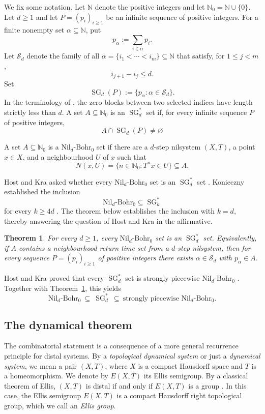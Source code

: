 \documentclass[11pt]{amsart}
\newtheorem{theorem}{Theorem}[section]
\theoremstyle{definition}
\theoremstyle{remark}
\DeclareMathOperator{\SG}{SG}
\newcommand{\N}{\mathbb N}
\newcommand{\Nzero}{\mathbb N_0}
\newcommand{\Z}{\mathbb Z}
\newcommand{\Sd}{\mathcal S_d}
\newcommand{\NilBohr}[1]{\mathrm{Nil}_{#1}\text{-}\mathrm{Bohr}_0}
\begin{document}
We fix some notation. Let $\N$ denote the positive integers and let $\N_0=\N\cup \{0\}$.
Let $d\geq1$ and let $P=(p_i)_{i\geq1}$ be an infinite
sequence of positive integers.  For a finite nonempty set
$\alpha\subseteq\N$, put
\[
 p_\alpha:=\sum_{i\in\alpha}p_i.
\]
Let $\Sd$ denote the family of all
$\alpha=\{i_1<\cdots<i_m\}\subseteq\N$ that satisfy, for $1\leq j<m$,
\[
 i_{j+1}-i_j\leq d.
\]
Set
\[
 \SG_d(P):=\{p_\alpha:\alpha\in\Sd\}.
\]
In the terminology of \cite{HostKra2011}, the zero blocks between two
selected indices have length strictly less than $d$.  A set $A\subseteq\Nzero$
is an $\SG_d^*$ set if, for every infinite sequence $P$ of positive integers,
\[
 A\cap\SG_d(P)\neq\varnothing
\]

A set $A\subseteq\Nzero$ is a $\NilBohr{d}$ set if there are a $d$-step
nilsystem $(X,T)$, a point $x\in X$, and a neighbourhood $U$ of $x$ such that
\[
 N(x,U)=\{n\in\Nzero:T^n x\in U\}\subseteq A.
\]

Host and Kra asked whether every $\NilBohr{d}$ set is an $\SG_d^*$ set
\cite[Question~2.11]{HostKra2011}.  Konieczny established the inclusion
\[
\NilBohr{d}\subseteq\SG_k^*
\]
for every $k\geq 4d$ \cite[Theorem~1.1]{Konieczny2017}.  The theorem below
establishes the inclusion with $k=d$, thereby answering the question of
Host and Kra in the affirmative.


\begin{theorem}\label{thm:nilbohr}
For every $d\geq1$, every $\NilBohr{d}$ set is an $\SG_d^*$ set.
Equivalently, if $A$ contains a neighbourhood return time set from a $d$-step nilsystem, then for every sequence $P=(p_i)_{i\geq1}$ of positive
integers there exists $\alpha\in\Sd$ with $p_\alpha\in A$.
\end{theorem}

Host and Kra proved that every $\SG_d^*$ set is strongly piecewise $\NilBohr{d}$ \cite[Theorem~2.10]{HostKra2011}. Together with Theorem~\ref{thm:nilbohr}, this yields
\[
 \NilBohr{d}
 \ \subseteq\ \SG_d^*
 \ \subseteq\ \text{strongly piecewise }\NilBohr{d}.
\]
 





\subsection{The dynamical theorem}\label{sec:intro-dynamical}

The combinatorial statement is a consequence of a more general recurrence principle for distal systems. By a \emph{topological dynamical system} or just a \emph{dynamical system}, we mean a pair $(X,T)$, where $X$ is a compact Hausdorff space and $T$ is a homeomorphism. We denote by $E(X, T)$ its Ellis semigroup. 
By a classical theorem of Ellis, $(X,T)$ is distal if and only if $E(X,T)$ is a group \cite{Ellis1969}. In this case, the Ellis semigroup $E(X,T)$ is a compact Hausdorff right topological group, which we call an \emph{Ellis group}.
 
\end{document}
